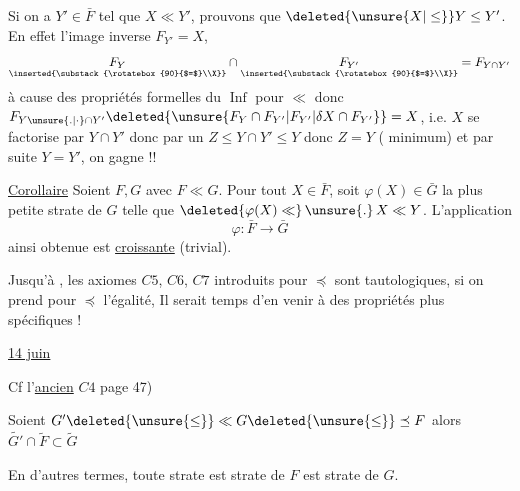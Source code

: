 Si on a $Y'\in\bar F$ tel que $X\ll Y'$, prouvons que $\deleted{\unsure{X|\leq}}Y\leq Y'$.  En  effet l'image inverse $F_{Y'}=X$, 
\[
 \underset{\inserted{\substack{\rotatebox{90}{$=$}\\X}}}{F_Y}\cap
 \underset{\inserted{\substack{\rotatebox{90}{$=$}\\X}}}{F_{Y'}}=F_{Y\cap Y'}
\]
à cause des propriétés formelles du $\operatorname{Inf}$ pour $\ll$ donc $F_{Y\unsure{.|\cdot}\cap Y'}\deleted{\unsure{F_Y\cap F_{Y'}|F_{Y'}|\delta X\cap F_{Y'}}}=X$, i.e. $X$ se factorise par $Y\cap Y'$ donc par un $Z\leq Y\cap Y'\leq Y$ donc $Z=Y$ ( minimum) et par suite $Y=Y'$, on gagne !!


\uline{Corollaire} Soient $F,G$ avec $F\ll G$. Pour tout $X\in\bar F$, soit $\varphi(X)\in\bar G$ la plus petite strate  de $G$ telle que $\deleted{\varphi(X)\ll}\,\unsure{.}\,X\ll Y$. L'application
\[
 \varphi:\bar F\longrightarrow\bar G
\]
ainsi obtenue est \uline{croissante} (trivial).

Jusqu'à , les axiomes $C5$, $C6$, $C7$ introduits pour $\preceq$  sont tautologiques, si on prend pour $\preceq$ l'égalité,  Il serait temps d'en venir à des propriétés  plus spécifiques !

\uline{14 juin}


  Cf l'\uline{ancien} $C4$  page 47)

Soient $G'\deleted{\unsure{\leq}}\ll G\deleted{\unsure{\leq}}\preceq F$ alors $\widetilde{G'}\cap\widetilde F\subset\widetilde G$

En d'autres termes, toute strate    est strate de $F$ est strate de $G$.

